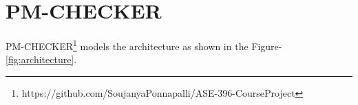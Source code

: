 \section{PM-CHECKER}



PM-CHECKER\footnote{https://github.com/SoujanyaPonnapalli/ASE-396-CourseProject}
models the architecture as shown in the Figure-\ref{fig:architecture}.
